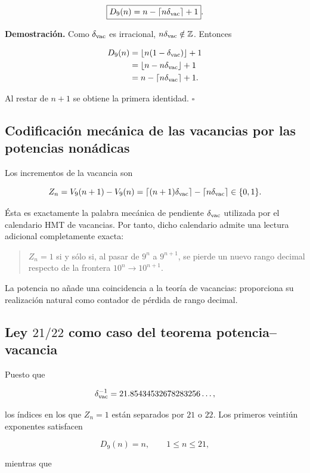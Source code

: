 \[
\boxed{D_9(n)=n-\left\lceil n\delta_{\rm vac}\right\rceil+1}.
\]

\textbf{Demostración.} Como \(\delta_{\rm vac}\) es irracional, \(n\delta_{\rm vac}\notin\mathbb Z\). Entonces

\[
\begin{aligned}
D_9(n)
&=\lfloor n(1-\delta_{\rm vac})\rfloor+1\\
&=\lfloor n-n\delta_{\rm vac}\rfloor+1\\
&=n-\lceil n\delta_{\rm vac}\rceil+1.
\end{aligned}
\]

Al restar de \(n+1\) se obtiene la primera identidad. \(\square\)

\subsection{Codificación mecánica de las vacancias por las potencias nonádicas}

Los incrementos de la vacancia son

\[
Z_n=V_9(n+1)-V_9(n)
=\lceil(n+1)\delta_{\rm vac}\rceil
-\lceil n\delta_{\rm vac}\rceil
\in\{0,1\}.
\]

Ésta es exactamente la palabra mecánica de pendiente \(\delta_{\rm vac}\) utilizada por el calendario HMT de vacancias. Por tanto, dicho calendario admite una lectura adicional completamente exacta:

\begin{quote}
\(Z_n=1\) si y sólo si, al pasar de \(9^n\) a \(9^{n+1}\), se pierde un nuevo rango decimal respecto de la frontera \(10^n\to10^{n+1}\).
\end{quote}

La potencia no añade una coincidencia a la teoría de vacancias: proporciona su realización natural como contador de pérdida de rango decimal.

\subsection{Ley \(21/22\) como caso del teorema potencia--vacancia}

Puesto que

\[
\delta_{\rm vac}^{-1}
=21.85434532678283256\ldots,
\]

los índices en los que \(Z_n=1\) están separados por \(21\) o \(22\). Los primeros veintiún exponentes satisfacen

\[
D_9(n)=n,\qquad1\le n\le21,
\]

mientras que


